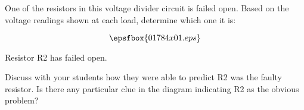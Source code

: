 

One of the resistors in this voltage divider circuit is failed open.  Based on the voltage readings shown at each load, determine which one it is:

$$\epsfbox{01784x01.eps}$$







Resistor R2 has failed open.







Discuss with your students how they were able to predict R2 was the faulty resistor.  Is there any particular clue in the diagram indicating R2 as the obvious problem?




